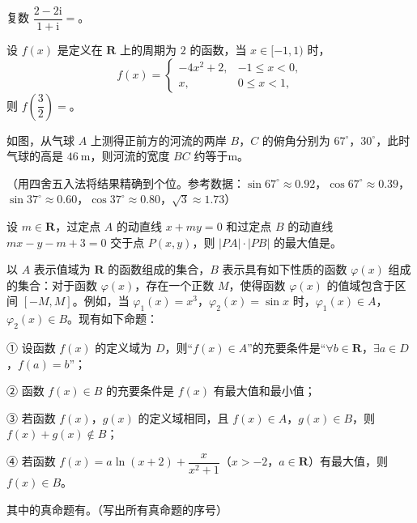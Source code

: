 \begin{question}
复数 $\dfrac{2-2\mathrm i}{1+\mathrm i}=$\gkblank{}。

\end{question}
\begin{question}
设 $f(x)$ 是定义在 $\mathbf R$ 上的周期为 $2$ 的函数，当 $x\in[-1,1)$ 时，
\nopagebreak[4]
\[f(x)=\begin{cases}-4x^2+2,&-1\leqslant x<0,\\x,&0\leqslant x<1,\end{cases}\]
则 $f\left(\dfrac32\right)=$\gkblank{}。

\Needspace{0.4\textheight}
\end{question}
\begin{question}
如图，从气球 $A$ 上测得正前方的河流的两岸 $B$，$C$ 的俯角分别为 $67^\circ$，$30^\circ$，此时气球的高是 $46\ \mathrm m$，则河流的宽度 $BC$ 约等于\gkblank{}$\mathrm m$。

（用四舍五入法将结果精确到个位。参考数据：$\sin67^\circ\approx 0.92$，$\cos67^\circ\approx 0.39$，$\sin37^\circ\approx 0.60$，$\cos37^\circ\approx 0.80$，$\sqrt3\approx 1.73$）
\nopagebreak[4]
\begin{center}\end{center}
\nopagebreak[4]
\end{question}
\begin{question}
设 $m\in\mathbf R$，过定点 $A$ 的动直线 $x+my=0$ 和过定点 $B$ 的动直线 $mx-y-m+3=0$ 交于点 $P(x,y)$，则 $|PA|\cdot|PB|$ 的最大值是\gkblank{}。

\end{question}
\begin{question}
以 $A$ 表示值域为 $\mathbf R$ 的函数组成的集合，$B$ 表示具有如下性质的函数 $\varphi(x)$ 组成的集合：对于函数 $\varphi(x)$，存在一个正数 $M$，使得函数 $\varphi(x)$ 的值域包含于区间 $[-M,M]$。例如，当 $\varphi_1(x)=x^3$，$\varphi_2(x)=\sin x$ 时，$\varphi_1(x)\in A$，$\varphi_2(x)\in B$。现有如下命题：

① 设函数 $f(x)$ 的定义域为 $D$，则“$f(x)\in A$”的充要条件是“$\forall b\in\mathbf R$，$\exists a\in D$，$f(a)=b$”；

② 函数 $f(x)\in B$ 的充要条件是 $f(x)$ 有最大值和最小值；

③ 若函数 $f(x)$，$g(x)$ 的定义域相同，且 $f(x)\in A$，$g(x)\in B$，则 $f(x)+g(x)\notin B$；

④ 若函数 $f(x)=a\ln(x+2)+\dfrac{x}{x^2+1}$（$x>-2$，$a\in\mathbf R$）有最大值，则 $f(x)\in B$。

其中的真命题有\gkblank{}。（写出所有真命题的序号）

\end{question}

